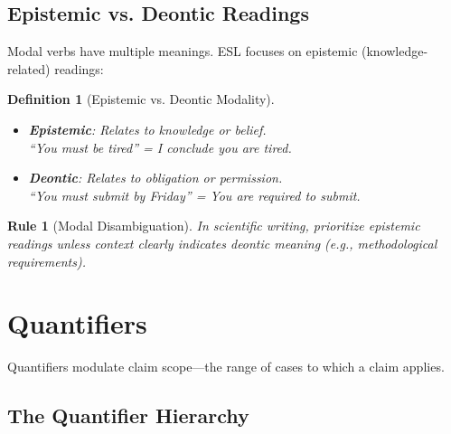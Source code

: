 \documentclass[11pt,a4paper]{article}
\newtheorem{definition}{Definition}[section]
\newtheorem{rule_def}{Rule}[section]
\theoremstyle{remark}
\begin{document}
\subsection{Epistemic vs. Deontic Readings}

Modal verbs have multiple meanings. ESL focuses on epistemic (knowledge-related) readings:

\begin{definition}[Epistemic vs. Deontic Modality]
\label{def:epistemic-deontic}
\begin{itemize}
    \item \textbf{Epistemic}: Relates to knowledge or belief. \\
    ``You \textit{must} be tired'' = I conclude you are tired.

    \item \textbf{Deontic}: Relates to obligation or permission. \\
    ``You \textit{must} submit by Friday'' = You are required to submit.
\end{itemize}
\end{definition}

\begin{rule_def}[Modal Disambiguation]
\label{rule:modal}
In scientific writing, prioritize epistemic readings unless context clearly indicates deontic meaning (e.g., methodological requirements).
\end{rule_def}


\section{Quantifiers}
\label{sec:quantifiers}

Quantifiers modulate claim scope---the range of cases to which a claim applies.

\subsection{The Quantifier Hierarchy}
\end{document}
